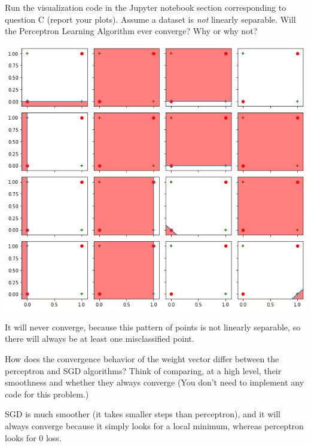 \begin{problem}[2]
  Run the visualization code in the Jupyter notebook section corresponding to question C (report your plots). Assume a dataset is \emph{not} linearly separable. Will the Perceptron Learning Algorithm ever converge? Why or why not?
\end{problem}
\begin{solution}

  \includegraphics[width=\textwidth]{images/4c.png}

  It will never converge, because this pattern of points is not linearly separable, so there will always be at least one misclassified point.
\end{solution}

\begin{problem}[2]
How does the convergence behavior of the weight vector differ between the perceptron and SGD algorithms? Think of comparing, at a high level, their smoothness and whether they always converge (You don't need to implement any code for this problem.)
\end{problem}
\begin{solution}
  SGD is much smoother (it takes smaller steps than perceptron), and it will always converge because it simply looks for a local minimum, whereas perceptron looks for 0 loss.
\end{solution}

